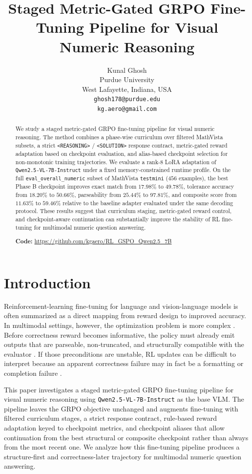 \documentclass{article} %
\title{Staged Metric-Gated GRPO Fine-Tuning Pipeline for Visual Numeric Reasoning}
\author{Kunal Ghosh\\
Purdue University\\
West Lafayette, Indiana, USA\\
\texttt{ghosh178@purdue.edu}\\
\texttt{kg.aero@gmail.com}}
\begin{document}
\maketitle
\fancyhead{}
\lhead{}
\chead{}
\rhead{}

\begin{abstract}
We study a staged metric-gated GRPO fine-tuning pipeline for visual numeric reasoning. The method combines a phase-wise curriculum over filtered MathVista subsets, a strict \texttt{<REASONING>} / \texttt{<SOLUTION>} response contract, metric-gated reward adaptation based on checkpoint evaluation, and alias-based checkpoint selection for non-monotonic training trajectories. We evaluate a rank-8 LoRA adaptation of \texttt{Qwen2.5-VL-7B-Instruct} under a fixed memory-constrained runtime profile. On the full \texttt{eval\_overall\_numeric} subset of MathVista \texttt{testmini} ($456$ examples), the best Phase B checkpoint improves exact match from $17.98\%$ to $49.78\%$, tolerance accuracy from $18.20\%$ to $50.66\%$, parseability from $25.44\%$ to $97.81\%$, and composite score from $11.63\%$ to $59.46\%$ relative to the baseline adapter evaluated under the same decoding protocol. These results suggest that curriculum staging, metric-gated reward control, and checkpoint-aware continuation can substantially improve the stability of RL fine-tuning for multimodal numeric question answering.

\textbf{Code:} \url{https://github.com/kgaero/RL_GSPO_Qwen2.5_7B}
\end{abstract}

\section{Introduction}

Reinforcement-learning fine-tuning for language and vision-language models is often summarized as a direct mapping from reward design to improved accuracy. In multimodal settings, however, the optimization problem is more complex \citep{yuan2025vlcogito}. Before correctness reward becomes informative, the policy must already emit outputs that are parseable, non-truncated, and structurally compatible with the evaluator \citep{shen2025satori}. If those preconditions are unstable, RL updates can be difficult to interpret because an apparent correctness failure may in fact be a formatting or completion failure \citep{shen2025satori}.

This paper investigates a staged metric-gated GRPO fine-tuning pipeline for visual numeric reasoning using \texttt{Qwen2.5-VL-7B-Instruct} as the base VLM. The pipeline leaves the GRPO objective unchanged and augments fine-tuning with filtered curriculum stages, a strict response contract, rule-based reward adaptation keyed to checkpoint metrics, and checkpoint aliases that allow continuation from the best structural or composite checkpoint rather than always from the most recent one. We analyze how this fine-tuning pipeline produces a structure-first and correctness-later trajectory for multimodal numeric question answering.
\end{document}

